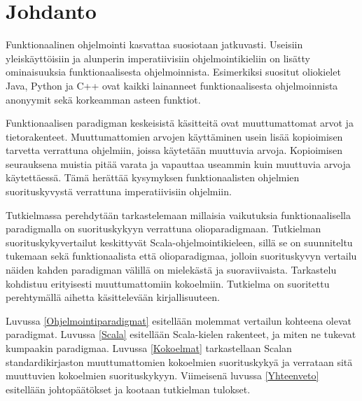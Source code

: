 \chapter{Johdanto} \label{Johdanto}
Funktionaalinen ohjelmointi kasvattaa suosiotaan jatkuvasti. Useisiin yleiskäyttöisiin ja alunperin imperatiivisiin ohjelmointikieliin on lisätty ominaisuuksia funktionaalisesta ohjelmoinnista. Esimerkiksi suositut oliokielet Java, Python ja C++ ovat kaikki lainanneet funktionaalisesta ohjelmoinnista anonyymit sekä korkeamman asteen funktiot.

Funktionaalisen paradigman keskeisistä käsitteitä ovat muuttumattomat arvot ja tietorakenteet. Muuttumattomien arvojen käyttäminen usein lisää kopioimisen tarvetta verrattuna ohjelmiin, joissa käytetään muuttuvia arvoja. Kopioimisen seurauksena muistia pitää varata ja vapauttaa useammin kuin muuttuvia arvoja käytettäessä. Tämä herättää kysymyksen funktionaalisten ohjelmien suorituskyvystä verrattuna imperatiivisiin ohjelmiin.

Tutkielmassa perehdytään tarkastelemaan millaisia vaikutuksia funktionaalisella paradigmalla on suorituskykyyn verrattuna olioparadigmaan. Tutkielman suorituskykyvertailut keskittyvät Scala-ohjelmointikieleen, sillä se on suunniteltu tukemaan sekä funktionaalista että olioparadigmaa, jolloin suorituskyvyn vertailu näiden kahden paradigman välillä on mielekästä ja suoraviivaista. Tarkastelu kohdistuu erityisesti muuttumattomiin kokoelmiin.  Tutkielma on suoritettu perehtymällä aihetta käsittelevään kirjallisuuteen.

Luvussa \ref{Ohjelmointiparadigmat} esitellään molemmat vertailun kohteena olevat paradigmat. Luvussa \ref{Scala} esitellään Scala-kielen rakenteet, ja miten ne tukevat kumpaakin paradigmaa. Luvussa \ref{Kokoelmat} tarkastellaan Scalan standardikirjaston muuttumattomien kokoelmien suorituskykyä ja verrataan sitä muuttuvien kokoelmien suorituskykyyn.  Viimeisenä luvussa \ref{Yhteenveto} esitellään johtopäätökset ja kootaan tutkielman tulokset.

